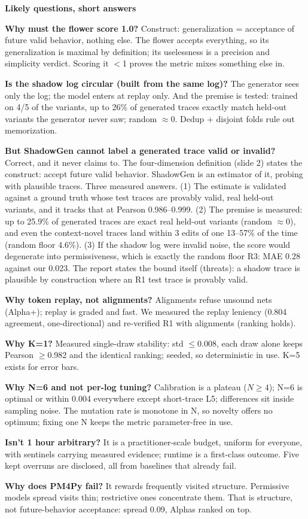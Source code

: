 \documentclass[10pt,twocolumn]{article}
\newcommand{\hdr}[1]{\vspace{5pt}\noindent\textcolor{hd}{\textbf{\large #1}}\par\vspace{2pt}}
\newcommand{\kv}[2]{\noindent\textbf{#1} #2\par}
\begin{document}
\hdr{Likely questions, short answers}
\kv{Why must the flower score 1.0?}{Construct: generalization = acceptance of future valid behavior, nothing else. The flower accepts everything, so its generalization is maximal by definition; its uselessness is a precision and simplicity verdict. Scoring it $<$1 proves the metric mixes something else in.}
\kv{Is the shadow log circular (built from the same log)?}{The generator sees only the log; the model enters at replay only. And the premise is tested: trained on 4/5 of the variants, up to 26\% of generated traces exactly match held-out variants the generator never saw; random $\approx$0. Dedup + disjoint folds rule out memorization.}
\kv{But ShadowGen cannot label a generated trace valid or invalid?}{Correct, and it never claims to. The four-dimension definition (slide 2) states the construct: accept future valid behavior. ShadowGen is an estimator of it, probing with plausible traces. Three measured answers. (1) The estimate is validated against a ground truth whose test traces are provably valid, real held-out variants, and it tracks that at Pearson 0.986--0.999. (2) The premise is measured: up to 25.9\% of generated traces are exact real held-out variants (random $\approx$0), and even the context-novel traces land within 3 edits of one 13--57\% of the time (random floor 4.6\%). (3) If the shadow log were invalid noise, the score would degenerate into permissiveness, which is exactly the random floor R3: MAE 0.28 against our 0.023. The report states the bound itself (threats): a shadow trace is plausible by construction where an R1 test trace is provably valid.}
\kv{Why token replay, not alignments?}{Alignments refuse unsound nets (Alpha+); replay is graded and fast. We measured the replay leniency (0.804 agreement, one-directional) and re-verified R1 with alignments (ranking holds).}
\kv{Why K=1?}{Measured single-draw stability: std $\le$0.008, each draw alone keeps Pearson $\ge$0.982 and the identical ranking; seeded, so deterministic in use. K=5 exists for error bars.}
\kv{Why N=6 and not per-log tuning?}{Calibration is a plateau ($N\ge4$); N=6 is optimal or within 0.004 everywhere except short-trace L5; differences sit inside sampling noise. The mutation rate is monotone in N, so novelty offers no optimum; fixing one N keeps the metric parameter-free in use.}
\kv{Isn't 1 hour arbitrary?}{It is a practitioner-scale budget, uniform for everyone, with sentinels carrying measured evidence; runtime is a first-class outcome. Five kept overruns are disclosed, all from baselines that already fail.}
\kv{Why does PM4Py fail?}{It rewards frequently visited structure. Permissive models spread visits thin; restrictive ones concentrate them. That is structure, not future-behavior acceptance: spread 0.09, Alphas ranked on top.}
\end{document}
